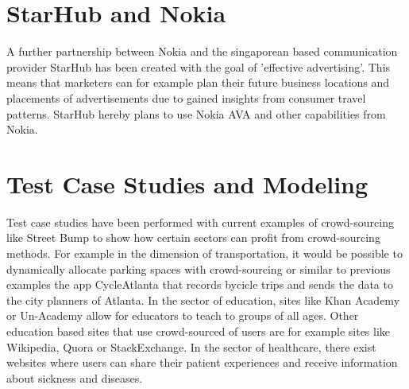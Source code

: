 \documentclass[a4paper,12pt]{report}
\begin{document}
	\section[StarHub and Nokia]{StarHub and Nokia \cite{StarhubNokia}}
	\startsection
		A further partnership between Nokia and the singaporean  based communication provider StarHub has been created with the goal of 'effective advertising'. This means that marketers can for example plan their future business locations and placements of advertisements due to gained insights from consumer travel patterns. StarHub hereby plans to use Nokia AVA and other capabilities from Nokia. 
	\closesection
	
	\section[Test Case Studies and Modeling]{Test Case Studies and Modeling \cite{CrowdSourcing}}
	\startsection
		Test case studies have been performed with current examples of crowd-sourcing like Street Bump to show how certain sectors can profit from crowd-sourcing methods. For example in the dimension of transportation, it would be possible to dynamically allocate parking spaces with crowd-sourcing or similar to previous examples the app CycleAtlanta that records bycicle trips and sends the data to the city planners of Atlanta. In the sector of education, sites like Khan Academy or Un-Academy allow for educators to teach to groups of all ages. Other education based sites that use crowd-sourced of users are for example sites like Wikipedia, Quora or StackExchange. In the sector of healthcare, there exist websites where users can share their patient experiences and receive information about sickness and diseases.
	\closesection
\end{document}
